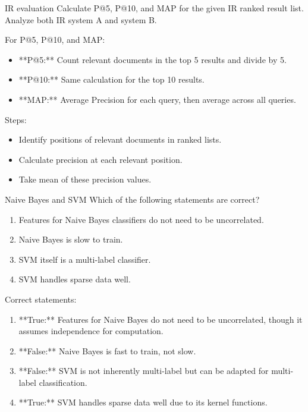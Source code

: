\documentclass{article}
\begin{document}
\begin{exercise}{IR evaluation}
  Calculate P@5, P@10, and MAP for the given IR ranked result list. Analyze both IR system A and system B.

  \begin{solution}
    For P@5, P@10, and MAP:
    \begin{itemize}
        \item **P@5:** Count relevant documents in the top 5 results and divide by 5.
        \item **P@10:** Same calculation for the top 10 results.
        \item **MAP:** Average Precision for each query, then average across all queries.
    \end{itemize}
    Steps:
    \begin{itemize}
        \item Identify positions of relevant documents in ranked lists.
        \item Calculate precision at each relevant position.
        \item Take mean of these precision values.
    \end{itemize}
  \end{solution}
\end{exercise}

\begin{exercise}{Naive Bayes and SVM}
  Which of the following statements are correct?
  \begin{enumerate}
    \item Features for Naive Bayes classifiers do not need to be uncorrelated.
    \item Naive Bayes is slow to train.
    \item SVM itself is a multi-label classifier.
    \item SVM handles sparse data well.
  \end{enumerate}

  \begin{solution}
    Correct statements:
    \begin{enumerate}
        \item **True:** Features for Naive Bayes do not need to be uncorrelated, though it assumes independence for computation.
        \item **False:** Naive Bayes is fast to train, not slow.
        \item **False:** SVM is not inherently multi-label but can be adapted for multi-label classification.
        \item **True:** SVM handles sparse data well due to its kernel functions.
    \end{enumerate}
  \end{solution}
\end{exercise}
\end{document}
